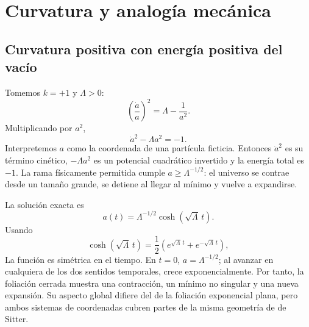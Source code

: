 \begin{classroomqa}
\end{classroomqa}

\section{Curvatura y analogía mecánica}

\subsection{Curvatura positiva con energía positiva del vacío}

Tomemos \(k=+1\) y \(\Lambda>0\):
\begin{equation}
\left(\frac{\dot a}{a}\right)^2=\Lambda-\frac{1}{a^2}.
\label{eq:c05-closed-vacuum}
\end{equation}
Multiplicando por \(a^2\),
\begin{equation}
\dot a^2-\Lambda a^2=-1.
\label{eq:c05-inverted-oscillator}
\end{equation}
Interpretemos \(a\) como la coordenada de una partícula ficticia. Entonces \(\dot a^2\) es su término cinético, \(-\Lambda a^2\) es un potencial cuadrático invertido y la energía total es \(-1\). La rama físicamente permitida cumple \(a\geq\Lambda^{-1/2}\): el universo se contrae desde un tamaño grande, se detiene al llegar al mínimo y vuelve a expandirse.

La solución exacta es
\begin{equation}
a(t)=\Lambda^{-1/2}\cosh(\sqrt{\Lambda}\,t).
\label{eq:c05-closed-desitter}
\end{equation}
Usando
\begin{equation}
\cosh(\sqrt{\Lambda}\,t)
=
\frac12\left(e^{\sqrt{\Lambda}\,t}+e^{-\sqrt{\Lambda}\,t}\right),
\end{equation}
La función es simétrica en el tiempo. En \(t=0\), \(a=\Lambda^{-1/2}\); al avanzar en cualquiera de los dos sentidos temporales, crece exponencialmente. Por tanto, la foliación cerrada muestra una contracción, un mínimo no singular y una nueva expansión. Su aspecto global difiere del de la foliación exponencial plana, pero ambos sistemas de coordenadas cubren partes de la misma geometría de de Sitter.

